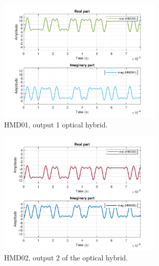 		\begin{figure}[H]
			\centering
				\centering
				\includegraphics[width=0.7\textwidth]
				{./sdf/m_qam_system/figures/simulations/01_noISI/HMD01.pdf}
						\caption{HMD01, output 1 optical hybrid.}
		\end{figure}
	\begin{figure}[H]
				\centering
				\includegraphics[width=0.7\textwidth]
				{./sdf/m_qam_system/figures/simulations/01_noISI/HMD02.pdf}
		\caption{HMD02, output 2 of the optical hybrid.}
		\end{figure}
	
